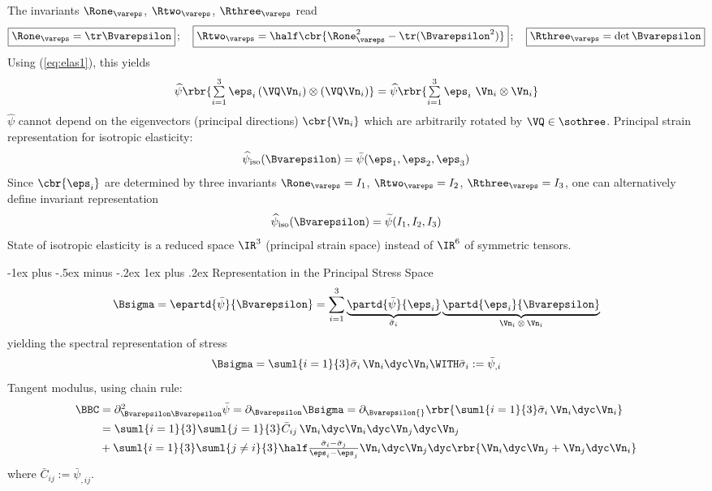 \documentclass[10pt,landscape]{article}
\makeatletter
\newcommand{\veps}{\vareps}
\def\Bveps{\Bvarepsilon}
\renewcommand{\subsubsection}{\@startsection{subsubsection}{3}{0mm}%
                                {-1ex plus -.5ex minus -.2ex}%
                                {1ex plus .2ex}%
                                {\normalfont\small\bfseries}}
\makeatother
\begin{document}
\begin{multicols*}{3}
The invariants $\Rone_\veps$, $\Rtwo_\veps$, $\Rthree_\veps$ read
\begin{equation}
  \boxed{\Rone_\veps=\tr\Bveps}\,;\quad
  \boxed{\Rtwo_\veps=\half\cbr{\Rone_\veps^2-\tr(\Bveps^2)}}\,;\quad
  \boxed{\Rthree_\veps = \det\Bveps}
\end{equation}
%
Using (\ref{eq:elas1}), this yields
%
\begin{equation}
\textstyle  \widehat{\psi}\rbr{\sum\limits_{i=1}^3 \eps_i\,(\VQ\Vn_i)\otimes(\VQ\Vn_i)}
  = \widehat{\psi}\rbr{\sum\limits_{i=1}^3 \eps_i\,\,\Vn_i\otimes\Vn_i}
\end{equation}
%
$\widehat{\psi}$ cannot depend on the eigenvectors (principal directions)
$\cbr{\Vn_i}$ which are arbitrarily rotated by $\VQ\in\sothree$.
Principal strain representation for isotropic elasticity:
%
\begin{equation}
  \widehat{\psi}_\textup{iso}(\Bveps) = \bar{\psi}(\eps_1,\eps_2,\eps_3)
\end{equation}
Since $\cbr{\eps_i}$ are determined by three invariants $\Rone_\veps=I_1$,
$\Rtwo_\veps=I_2$, $\Rthree_\veps=I_3$, one can
alternatively define invariant representation
%
\begin{equation}
  \widehat{\psi}_\textup{iso}(\Bveps) = \widetilde{\psi}(I_1,I_2,I_3)
\end{equation}
State of isotropic elasticity is a reduced space $\IR^3$ (principal strain
space) instead of $\IR^6$ of symmetric tensors.

\subsubsection{Representation in the Principal Stress Space}
\begin{equation}
  \Bsigma = \epartd{\bar{\psi}}{\Bveps}=
  \sum\limits_{i=1}^{3}
  \underbrace{\partd{\bar{\psi}}{\eps_i}}_\text{$\bar{\sigma}_i$}
  \underbrace{\partd{\eps_i}{\Bveps}}_\text{$\Vn_i\otimes\Vn_i$}
\end{equation}
yielding the spectral representation of stress
\begin{equation}
  \Bsigma=\suml{i=1}{3}\bar{\sigma}_i\,\Vn_i\dyc\Vn_i \WITH \bar{\sigma}_i:=\bar{\psi}_{,i}
\end{equation}
Tangent modulus, using chain rule:
%
\begin{align}
 \nonumber \BBC &= \textstyle  \partial^2_{\Bveps\Bveps}\bar{\psi} = \partial_{\Bveps}\Bsigma
  = \partial_{\Bveps{}} \rbr{\suml{i=1}{3}\bar{\sigma}_i\,\Vn_i\dyc\Vn_i} \\
  \nonumber  & \textstyle = \suml{i=1}{3}\suml{j=1}{3} \bar{C}_{ij}\,\Vn_i\dyc\Vn_i\dyc\Vn_j\dyc\Vn_j \\
             & \textstyle + \suml{i=1}{3}\suml{j\neq i}{3}\half
               \frac{\bar{\sigma}_i-\bar{\sigma}_j}{\eps_i-\eps_j}
               \Vn_i\dyc\Vn_j\dyc\rbr{\Vn_i\dyc\Vn_j+\Vn_j\dyc\Vn_i}
\end{align}
where $\bar{C}_{ij}:=\bar{\psi}_{,ij}$.


\end{multicols*}
\end{document}
